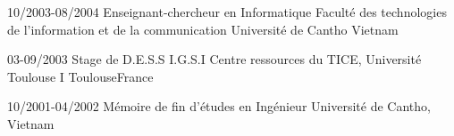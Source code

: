 	\vspace{-7pt}
	\cventry
	{10/2003-08/2004}
	{Enseignant-chercheur en Informatique}
	{Faculté des technologies de l'information et de la communication}
	{Université de Cantho}
	{Vietnam}
	{}	
	
	\vspace{-7pt}
	\cventry
	{03-09/2003}
	{Stage de D.E.S.S I.G.S.I}
	{Centre ressources du TICE, Université Toulouse I}
	{Toulouse}{France}{}

	

	\vspace{-7pt}
	\cventry
	{10/2001-04/2002}
	{Mémoire de fin d'études en Ingénieur}
	{Université de Cantho, Vietnam}
	{}
	{}
	{}






	
	
